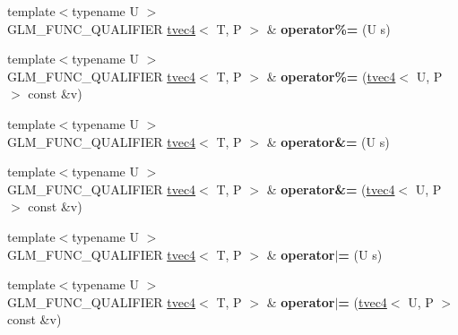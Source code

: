 \begin{DoxyCompactItemize}
\item 
\hypertarget{structglm_1_1detail_1_1tvec4_a39fbc616d6315dd06d87f6d9545a2a6c}{{\footnotesize template$<$typename U $>$ }\\G\-L\-M\-\_\-\-F\-U\-N\-C\-\_\-\-Q\-U\-A\-L\-I\-F\-I\-E\-R \hyperlink{structglm_1_1detail_1_1tvec4}{tvec4}$<$ T, P $>$ \& {\bfseries operator\%=} (U s)}\label{structglm_1_1detail_1_1tvec4_a39fbc616d6315dd06d87f6d9545a2a6c}

\item 
\hypertarget{structglm_1_1detail_1_1tvec4_a2168cec5b85e1dbdd947436d987ecbeb}{{\footnotesize template$<$typename U $>$ }\\G\-L\-M\-\_\-\-F\-U\-N\-C\-\_\-\-Q\-U\-A\-L\-I\-F\-I\-E\-R \hyperlink{structglm_1_1detail_1_1tvec4}{tvec4}$<$ T, P $>$ \& {\bfseries operator\%=} (\hyperlink{structglm_1_1detail_1_1tvec4}{tvec4}$<$ U, P $>$ const \&v)}\label{structglm_1_1detail_1_1tvec4_a2168cec5b85e1dbdd947436d987ecbeb}

\item 
\hypertarget{structglm_1_1detail_1_1tvec4_aade398fa99de720151babd3fccce5500}{{\footnotesize template$<$typename U $>$ }\\G\-L\-M\-\_\-\-F\-U\-N\-C\-\_\-\-Q\-U\-A\-L\-I\-F\-I\-E\-R \hyperlink{structglm_1_1detail_1_1tvec4}{tvec4}$<$ T, P $>$ \& {\bfseries operator\&=} (U s)}\label{structglm_1_1detail_1_1tvec4_aade398fa99de720151babd3fccce5500}

\item 
\hypertarget{structglm_1_1detail_1_1tvec4_a8a3a49f8c26ce9f3f8330703018a57ce}{{\footnotesize template$<$typename U $>$ }\\G\-L\-M\-\_\-\-F\-U\-N\-C\-\_\-\-Q\-U\-A\-L\-I\-F\-I\-E\-R \hyperlink{structglm_1_1detail_1_1tvec4}{tvec4}$<$ T, P $>$ \& {\bfseries operator\&=} (\hyperlink{structglm_1_1detail_1_1tvec4}{tvec4}$<$ U, P $>$ const \&v)}\label{structglm_1_1detail_1_1tvec4_a8a3a49f8c26ce9f3f8330703018a57ce}

\item 
\hypertarget{structglm_1_1detail_1_1tvec4_a0a81f104c676c2317375b44b39f335bc}{{\footnotesize template$<$typename U $>$ }\\G\-L\-M\-\_\-\-F\-U\-N\-C\-\_\-\-Q\-U\-A\-L\-I\-F\-I\-E\-R \hyperlink{structglm_1_1detail_1_1tvec4}{tvec4}$<$ T, P $>$ \& {\bfseries operator$\vert$=} (U s)}\label{structglm_1_1detail_1_1tvec4_a0a81f104c676c2317375b44b39f335bc}

\item 
\hypertarget{structglm_1_1detail_1_1tvec4_a73389ea20bb805a54b9699bca730f142}{{\footnotesize template$<$typename U $>$ }\\G\-L\-M\-\_\-\-F\-U\-N\-C\-\_\-\-Q\-U\-A\-L\-I\-F\-I\-E\-R \hyperlink{structglm_1_1detail_1_1tvec4}{tvec4}$<$ T, P $>$ \& {\bfseries operator$\vert$=} (\hyperlink{structglm_1_1detail_1_1tvec4}{tvec4}$<$ U, P $>$ const \&v)}\label{structglm_1_1detail_1_1tvec4_a73389ea20bb805a54b9699bca730f142}


\end{DoxyCompactItemize}
